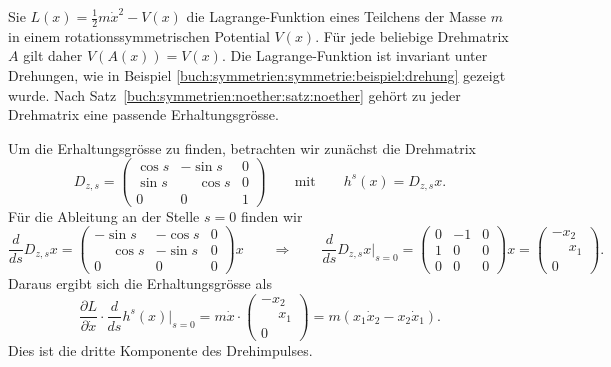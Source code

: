 \begin{beispiel}
\label{buch:symmetrien:noether:beispiel:drehimpuls}
Sie $L(x) = \frac12m\dot{x}^2 - V(x)$ die Lagrange-Funktion eines Teilchens
der Masse $m$ in einem rotationssymmetrischen Potential $V(x)$.
Für jede beliebige Drehmatrix $A$ gilt daher $V(A(x))=V(x)$.
Die Lagrange-Funktion ist invariant unter Drehungen, wie in Beispiel
\ref{buch:symmetrien:symmetrie:beispiel:drehung} gezeigt wurde.
Nach Satz~\ref{buch:symmetrien:noether:satz:noether} gehört zu jeder 
Drehmatrix eine passende Erhaltungsgrösse.

Um die Erhaltungsgrösse zu finden, betrachten wir zunächst die Drehmatrix
\[
D_{z,s}
=
\begin{pmatrix}
\cos s &          - \sin s & 0 \\
\sin s & \phantom{-}\cos s & 0 \\
   0   &            0      & 1
\end{pmatrix}
\qquad\text{mit}\qquad
h^s(x)
=
D_{z,s}x.
\]
Für die Ableitung an der Stelle $s=0$ finden wir
\[
\frac{d}{ds} D_{z,s}x
=
\begin{pmatrix}
          -\sin s & -\cos s & 0 \\
\phantom{-}\cos s & -\sin s & 0 \\
        0         &    0    & 0
\end{pmatrix}
x
\qquad\Rightarrow\qquad
\frac{d}{ds} D_{z,s}x
\bigg|_{s=0}
=
\begin{pmatrix}
 0 & -1 & 0 \\
 1 &  0 & 0 \\
 0 &  0 & 0
\end{pmatrix}
x
=
\begin{pmatrix}
-x_2\\
\phantom{-}x_1\\
0
\end{pmatrix}.
\]
Daraus ergibt sich die Erhaltungsgrösse als
\[
\frac{\partial L}{\partial\dot{x}}
\cdot
\frac{d}{ds}h^s(x)\bigg|_{s=0}
=
m\dot{x}\cdot
\begin{pmatrix}
-x_2\\
\phantom{-}x_1\\
0
\end{pmatrix}
=
m(x_1\dot{x}_2 - x_2\dot{x}_1).
\]
Dies ist die dritte Komponente des Drehimpulses.
%


\end{beispiel}

